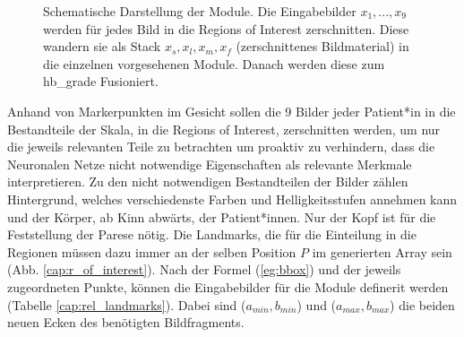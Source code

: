\begin{figure}[!tb]
\caption[Darstellung der Modulbauweise]{{Schematische Darstellung der Module. Die Eingabebilder $x_1, ..., x_9$ werden für jedes Bild in die Regions of Interest zerschnitten. Diese wandern sie als Stack $x_s, x_l, x_m, x_f$ (zerschnittenes Bildmaterial) in die einzelnen vorgesehenen Module. Danach werden diese zum \ac{hb_grade} Fusioniert.}\label{cap:module_graph}}
\end{figure}\label{fig:module_graph}

Anhand von Markerpunkten im Gesicht sollen die 9 Bilder jeder Patient*in in die Bestandteile der Skala, in die Regions of Interest, zerschnitten werden, um nur die jeweils relevanten Teile zu betrachten um proaktiv zu verhindern, dass die Neuronalen Netze nicht notwendige Eigenschaften als relevante Merkmale interpretieren. Zu den nicht notwendigen Bestandteilen der Bilder zählen Hintergrund, welches verschiedenste Farben und Helligkeitsstufen annehmen kann und der Körper, ab Kinn abwärts, der Patient*innen. Nur der Kopf ist für die Feststellung der Parese nötig. Die Landmarks, die für die Einteilung in die Regionen müssen dazu immer an der selben Position $P$ im generierten Array sein (Abb. \ref{cap:r_of_interest}). Nach der Formel (\ref{eg:bbox}) und der jeweils zugeordneten Punkte, können die Eingabebilder für die Module definerit werden (Tabelle \ref{cap:rel_landmarks}). Dabei sind ($a_{min}, b_{min}$) und ($a_{max}, b_{max}$) die beiden neuen Ecken des benötigten Bildfragments.

